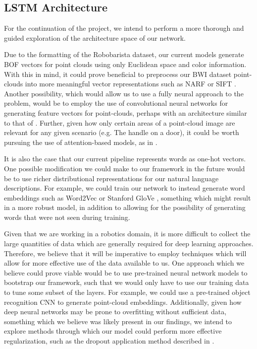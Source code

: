 \documentclass[letterpaper, 12 pt, conference]{ieeeconf}
\begin{document}
\subsection{LSTM Architecture}

For the continuation of the project, we intend to perform a more thorough and guided exploration of the architecture space of our network.

Due to the formatting of the Robobarista dataset, our current models generate BOF vectors for point clouds using only Euclidean space and color information. With this in mind, it could prove beneficial to preprocess our BWI dataset point-clouds into more meaningful vector representations such as NARF \cite{steder2010narf} or SIFT \cite{lowe2004distinctive}. Another possibility, which would allow us to use a fully neural approach to the problem, would be to employ the use of convolutional neural networks for generating feature vectors for point-clouds, perhaps with an architecture similar to that of \cite{socher2012convolutional}. Further, given how only certain areas of a point-cloud image are relevant for any given scenario (e.g. The handle on a door), it could be worth pursuing the use of attention-based models, as in \cite{Xiao_2015_CVPR}. 

It is also the case that our current pipeline represents words as one-hot vectors. One possible modification we could make to our framework in the future would be to use richer distributional representations for our natural language descriptions. For example, we could train our network to instead generate word embeddings such as Word2Vec \cite{mikolov2013distributed} or Stanford GloVe \cite{pennington2014glove}, something which might result in a more robust model, in addition to allowing for the possibility of generating words that were not seen during training. 

Given that we are working in a robotics domain, it is more difficult to collect the large quantities of data which are generally required for deep learning approaches. Therefore, we believe that it will be imperative to employ techniques which will allow for more effective use of the data available to us. One approach which we believe could prove viable would be to use pre-trained neural network models to bootstrap our framework, such that we would only have to use our training data to tune some subset of the layers. For example, we could use a pre-trained object recognition CNN to generate point-cloud embeddings. Additionally, given how deep neural networks may be prone to overfitting without sufficient data, something which we believe was likely present in our findings, we intend to explore methods through which our model could perform more effective regularization, such as the dropout application method described in \cite{zaremba2014recurrent}.
\end{document}
